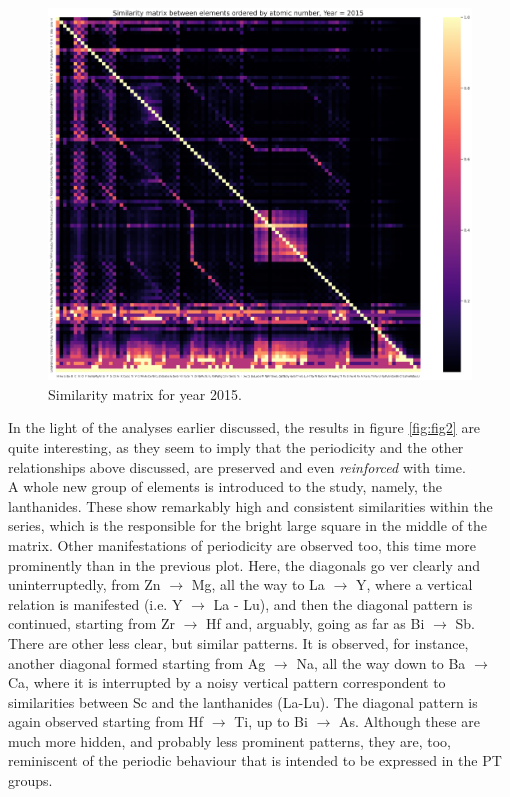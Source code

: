 \documentclass[article]{article}
\begin{document}
\begin{figure}[h!]
  \centering
	\includegraphics[width=14.0cm]{SM_2015.png}
	\caption{Similarity matrix for year 2015.}
	\label{fig:fig3}
\end{figure}

In the light of the analyses earlier discussed, the results in figure \ref{fig:fig2} are quite interesting, as they seem to imply that the periodicity and the other relationships above discussed, are preserved and even \textit{reinforced} with time. \\

A whole new group of elements is introduced to the study, namely, the lanthanides. These show remarkably high and consistent similarities within the series, which is the responsible for the bright large square in the middle of the matrix. Other manifestations of periodicity are observed too, this time more prominently than in the previous plot. Here, the diagonals go ver clearly and uninterruptedly, from Zn $\rightarrow$ Mg, all the way to La $\rightarrow$ Y, where a vertical relation is manifested (i.e. Y $\rightarrow$ La - Lu), and then the diagonal pattern is continued, starting from Zr $\rightarrow$ Hf and, arguably, going as far as Bi $\rightarrow$ Sb.\\

There are other less clear, but similar patterns. It is observed, for instance, another diagonal formed starting from Ag $\rightarrow$ Na, all the way down to Ba $\rightarrow$ Ca, where it is interrupted by a noisy vertical pattern correspondent to similarities between Sc and the lanthanides (La-Lu). The diagonal pattern is again observed starting from Hf $\rightarrow$ Ti, up to Bi $\rightarrow$ As. Although these are much more hidden, and probably less prominent patterns, they are, too, reminiscent of the periodic behaviour that is intended to be expressed in the PT groups. \\
\end{document}
